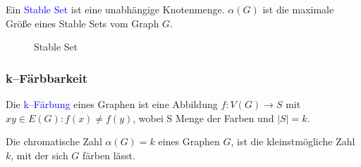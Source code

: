 \begin{definition}
Ein \textcolor{blue}{Stable Set} ist eine unabhängige Knotenmenge. $\alpha (G)$ ist die maximale Größe eines Stable Sets vom Graph $G$. \cite{Diestel}
\end{definition}


\begin{figure}[h]
\begin{center}
\caption[Stable Set]{Stable Set}
  \label{StableSet}
\end{center}
\end{figure}

\subsubsection*{k--Färbbarkeit}

\begin{definition}
Die \textcolor{blue}{k--Färbung} eines Graphen ist eine Abbildung $f: V(G) \rightarrow S$ mit $xy \in E(G): f(x) \neq f(y)$, wobei S Menge der Farben und $\vert S \vert = k$. \cite{Diestel, West}
\end{definition}

\begin{definition}
Die chromatische Zahl $\alpha(G)=k$ eines Graphen $G$, ist die kleinstmögliche Zahl $k$, mit der sich $G$ färben lässt. \cite{Diestel}
\end{definition}

